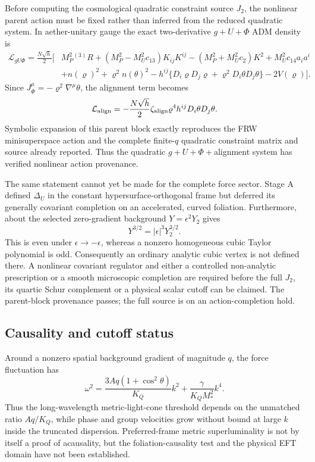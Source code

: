 Before computing the cosmological quadratic constraint source $J_2$, the
nonlinear parent action must be fixed rather than inferred from the reduced
quadratic system.  In aether-unitary gauge the exact two-derivative
$g+U+\Phi$ ADM density is
\begin{align}
 \mathcal L_{gU\Phi}=\frac{N\sqrt h}{2}\big[&
 M_P^2{}^{(3)}R+(M_P^2-M_U^2c_{13})K_{ij}K^{ij}
 -(M_P^2+M_U^2c_2)K^2+M_U^2c_{14}a_i a^i\nonumber\\
 &+n(\varrho)^2+\varrho^2n(\theta)^2
 -h^{ij}\{D_i\varrho D_j\varrho
 +\varrho^2D_i\theta D_j\theta\}-2V(\varrho)\big].
 \label{eq:nonlinear-adm-parent}
\end{align}
Since $J_\Phi^\mu=-\varrho^2\nabla^\mu\theta$, the alignment term becomes
\begin{equation}
 \mathcal L_{\rm align}=-\frac{N\sqrt h}{2}\zeta_{\rm align}
 \varrho^4h^{ij}D_i\theta D_j\theta .
 \label{eq:nonlinear-adm-alignment}
\end{equation}
Symbolic expansion of this parent block exactly reproduces the FRW
minisuperspace action and the complete finite-$q$ quadratic constraint matrix
and source already reported.  Thus the quadratic $g+U+\Phi+$alignment system
has verified nonlinear action provenance.

The same statement cannot yet be made for the complete force sector.  Stage A
defined $\Delta_U$ in the constant hypersurface-orthogonal frame but deferred
its generally covariant completion on an accelerated, curved foliation.
Furthermore, about the selected zero-gradient background
$Y=\epsilon^2Y_2$ gives
\begin{equation}
 Y^{3/2}=|\epsilon|^3Y_2^{3/2}.
 \label{eq:force-nonanalytic-origin}
\end{equation}
This is even under $\epsilon\to-\epsilon$, whereas a nonzero homogeneous cubic
Taylor polynomial is odd.  Consequently an ordinary analytic cubic vertex is
not defined there.  A nonlinear covariant regulator and either a controlled
non-analytic prescription or a smooth microscopic completion are required
before the full $J_2$, its quartic Schur complement or a physical scalar
cutoff can be claimed.  The parent-block provenance passes; the full source is
on an action-completion hold.

\subsection{Causality and cutoff status}

Around a nonzero spatial background gradient of magnitude $q$, the force
fluctuation has
\begin{equation}
 \omega^2=\frac{3Aq(1+\cos^2\theta)}{K_Q}k^2
 +\frac{\gamma}{K_QM_*^2}k^4.
 \label{eq:force-dispersion}
\end{equation}
Thus the long-wavelength metric-light-cone threshold depends on the unmatched
ratio $Aq/K_Q$, while phase and group velocities grow without bound at large
$k$ inside the truncated dispersion.  Preferred-frame metric superluminality
is not by itself a proof of acausality, but the foliation-causality test and the
physical EFT domain have not been established.

